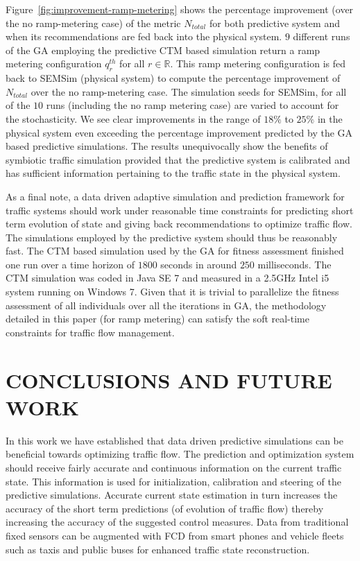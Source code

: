 \documentclass{wscpaperproc}
\theoremstyle{wsc}
\begin{document}
Figure~\ref{fig:improvement-ramp-metering} shows the percentage improvement (over the no ramp-metering case) of the metric $N_{total}$ for both predictive system and when its recommendations are fed back into the physical system. $9$ different runs of the GA employing the predictive CTM based simulation return a ramp metering configuration $q_r^{th}$ for all $r\in \mathbb{R}$. This ramp metering configuration is fed back to SEMSim (physical system) to compute the percentage improvement of $N_{total}$ over the no ramp-metering case. The simulation seeds for SEMSim, for all of the $10$ runs (including the no ramp metering case) are varied to account for the stochasticity.
We see clear improvements in the range of $18\%$ to $25\%$ in the physical system even exceeding the percentage improvement predicted by the GA based predictive simulations. The results unequivocally show the benefits of symbiotic traffic simulation provided that the predictive system is calibrated and has sufficient information pertaining to the traffic state in the physical system. 



As a final note, a data driven adaptive simulation and prediction framework for traffic systems should work under reasonable time constraints for predicting short term evolution of state and giving back recommendations to optimize traffic flow. The simulations employed by the predictive system should thus be reasonably fast. The CTM based simulation used by the GA for fitness assessment finished one run over a time horizon of $1800$ seconds in around $250$ milliseconds. The CTM simulation was coded in Java SE 7 and measured in a 2.5GHz Intel i5 system running on Windows 7. Given that it is trivial to parallelize the fitness assessment of all individuals over all the iterations in GA, the methodology detailed in this paper (for ramp metering) can satisfy the soft real-time constraints for traffic flow management.



\section{CONCLUSIONS AND FUTURE WORK}
\label{sec:conclusion}
In this work we have established that data driven predictive simulations can be beneficial towards optimizing traffic flow.  The prediction and optimization system should receive fairly accurate and continuous information on the current traffic state. This information is used for initialization, calibration and steering of the predictive simulations. Accurate current state estimation in turn increases the accuracy of the short term predictions (of evolution of traffic flow) thereby increasing the accuracy of the suggested control measures. Data from traditional fixed sensors can be augmented with FCD from smart phones and vehicle fleets such as taxis and public buses for enhanced traffic state reconstruction. 
\end{document}
